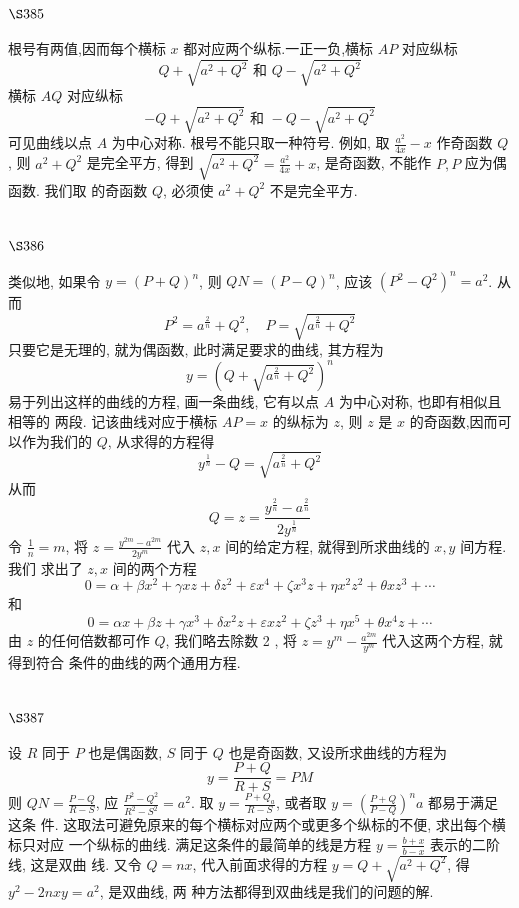 \section{$\S 385$}

根号有两值,因而每个横标 $x$ 都对应两个纵标.一正一负,横标 $A P$ 对应纵标
\[
Q+\sqrt{a^{2}+Q^{2}} \text { 和 } Q-\sqrt{a^{2}+Q^{2}}
\]
横标 $A Q$ 对应纵标
\[
-Q+\sqrt{a^{2}+Q^{2}} \text { 和 }-Q-\sqrt{a^{2}+Q^{2}}
\]
可见曲线以点 $A$ 为中心对称. 根号不能只取一种符号. 例如, 取 $\frac{a^{2}}{4 x}-x$ 作奇函数 $Q$, 则 $a^{2}+Q^{2}$ 是完全平方, 得到 $\sqrt{a^{2}+Q^{2}}=\frac{a^{2}}{4 x}+x$, 是奇函数, 不能作 $P, P$ 应为偶函数. 我们取 的奇函数 $Q$, 必须使 $a^{2}+Q^{2}$ 不是完全平方.

\section{$\S 386$}

类似地, 如果令 $y=(P+Q)^{n}$, 则 $Q N=(P-Q)^{n}$, 应该 $\left(P^{2}-Q^{2}\right)^{n}=a^{2}$. 从而
\[
P^{2}=a^{\frac{2}{n}}+Q^{2}, \quad P=\sqrt{a^{\frac{2}{n}}+Q^{2}}
\]
只要它是无理的, 就为偶函数, 此时满足要求的曲线, 其方程为 
\[
y=\left(Q+\sqrt{a^{\frac{2}{n}}+Q^2}\right)^n
\]易于列出这样的曲线的方程, 画一条曲线, 它有以点 $A$ 为中心对称, 也即有相似且相等的 两段. 记该曲线对应于横标 $A P=x$ 的纵标为 $z$, 则 $z$ 是 $x$ 的奇函数,因而可以作为我们的 $Q$, 从求得的方程得
\[
y^{\frac{1}{n}}-Q=\sqrt{a^{\frac{2}{n}}+Q^{2}}
\]
从而
\[
Q=z=\frac{y^{\frac{2}{n}}-a^{\frac{2}{n}}}{2 y^{\frac{1}{n}}}
\]
令 $\frac{1}{n}=m$, 将 $z=\frac{y^{2 m}-a^{2 m}}{2 y^{m}}$ 代入 $z, x$ 间的给定方程, 就得到所求曲线的 $x, y$ 间方程. 我们 求出了 $z, x$ 间的两个方程
\[
0=\alpha+\beta x^{2}+\gamma x z+\delta z^{2}+\varepsilon x^{4}+\zeta x^{3} z+\eta x^{2} z^{2}+\theta x z^{3}+\cdots
\]
和
\[
0=\alpha x+\beta z+\gamma x^{3}+\delta x^{2} z+\varepsilon x z^{2}+\zeta z^{3}+\eta x^{5}+\theta x^{4} z+\cdots
\]
由 $z$ 的任何倍数都可作 $Q$, 我们略去除数 2 , 将 $z=y^{m}-\frac{a^{2 m}}{y^{m}}$ 代入这两个方程, 就得到符合 条件的曲线的两个通用方程.

\section{$\S 387$}

设 $R$ 同于 $P$ 也是偶函数, $S$ 同于 $Q$ 也是奇函数, 又设所求曲线的方程为
\[
y=\frac{P+Q}{R+S}=P M
\]
则 $Q N=\frac{P-Q}{R-S}$, 应 $\frac{P^{2}-Q^{2}}{R^{2}-S^{2}}=a^{2}$. 取 $y=\frac{P+Q_{a}}{R-S}$, 或者取 $y=\left(\frac{P+Q}{P-Q}\right)^{n} a$ 都易于满足这条 件. 这取法可避免原来的每个横标对应两个或更多个纵标的不便, 求出每个横标只对应 一个纵标的曲线. 满足这条件的最简单的线是方程 $y=\frac{b+x}{b-x}$ 表示的二阶线, 这是双曲 线. 又令 $Q=n x$, 代入前面求得的方程 $y=Q+\sqrt{a^{2}+Q^{2}}$, 得 $y^{2}-2 n x y=a^{2}$, 是双曲线, 两 种方法都得到双曲线是我们的问题的解.

